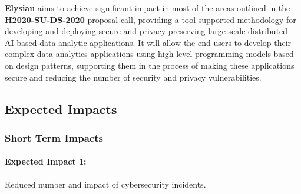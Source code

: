 \documentclass[a4paper,11pt]{article}
\newcommand{\project}[1]{\textbf{#1}\xspace}
\newcommand{\SECURITY}{\project{Elysian}}
\newcommand{\TheProject}{\SECURITY}
\begin{document}

\TheProject{} aims to achieve significant impact in most of the areas outlined in the \textbf{H2020-SU-DS-2020} proposal call, providing a tool-supported methodology for developing and deploying secure and privacy-preserving large-scale distributed AI-based data analytic applications. It will allow the end users to develop their complex data analytics applications using high-level programming models based on design patterns, supporting them in the process of making these applications secure and reducing the number of security and privacy vulnerabilities.  

\subsection{Expected Impacts}
\label{sect:expectedImpacts}

\subsubsection{Short Term Impacts}

\begin{mdframed}[backgroundcolor=blue!5]
\paragraph{Expected Impact 1:}
Reduced number and impact of cybersecurity incidents.
\end{mdframed}
\end{document}
